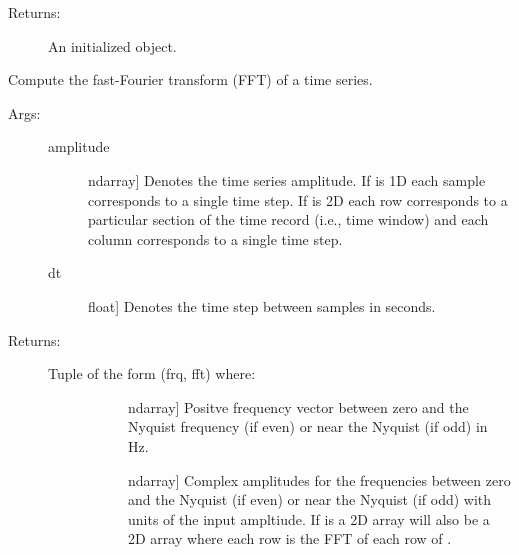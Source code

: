 \documentclass[letterpaper,10pt,english,openany,oneside]{sphinxmanual}
\begin{document}
\begin{fulllineitems}
\begin{fulllineitems}
\begin{description}
\begin{description}
\end{description}

\item[{Returns:}] \leavevmode
An initialized  object.

\end{description}

\end{fulllineitems}


\begin{fulllineitems}
\label{\detokenize{index:sigpropy.FourierTransform.fft}}
Compute the fast-Fourier transform (FFT) of a time series.
\begin{description}
\item[{Args:}] \leavevmode\begin{description}
\item[{amplitude}] \leavevmode{[}ndarray{]}
Denotes the time series amplitude. If  is 1D
each sample corresponds to a single time step. If
 is 2D each row corresponds to a particular
section of the time record (i.e., time window) and each
column corresponds to a single time step.

\item[{dt}] \leavevmode{[}float{]}
Denotes the time step between samples in seconds.

\end{description}

\item[{Returns:}] \leavevmode\begin{description}
\item[{Tuple of the form (frq, fft) where:}] \leavevmode\begin{description}
\item[{}] \leavevmode{[}ndarray{]}
Positve frequency vector between zero and the
Nyquist frequency (if even) or near the Nyquist
(if odd) in Hz.

\item[{}] \leavevmode{[}ndarray{]}
Complex amplitudes for the frequencies between zero
and the Nyquist (if even) or near the Nyquist 
(if odd) with units of the input ampltiude.
If  is a 2D array  will also be a 2D
array where each row is the FFT of each row of 
.


\end{description}
\end{description}
\end{description}
\end{fulllineitems}
\end{fulllineitems}
\end{document}
